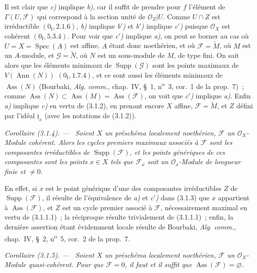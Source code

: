\documentclass[10pt,oneside]{book}
\makeatletter
\newenvironment{corollary}[1][]{%
  \par\medskip\noindent\itshape Corollaire (#1). ---\ }{\par}
\newcommand{\EGAReaderTarget}[2]{\hypertarget{#1}{}\@bsphack\begingroup\def\@currentHref{#1}\label{#2}\endgroup\@esphack}
\makeatother
\begin{document}
Il est clair que \emph{c)} implique \emph{b)}, car il suffit de prendre pour
$f$ l'élément de $\Gamma(U,\mathcal F)$ qui correspond à la section unité de
$\mathcal O_Z|U$. Comme $U\cap Z$ est irréductible $(0_{\mathrm I},2.1.6)$,
\emph{b)} implique \emph{b$'$)} et \emph{b$'$)} implique \emph{c$'$)} puisque
$\mathcal O_X$ est cohérent $(0_{\mathrm I},5.3.4)$. Pour voir que
\emph{c$'$)} implique \emph{a)}, on peut se borner au cas où
$U=X=\operatorname{Spec}(A)$ est affine, $A$ étant donc noethérien, et où
$\mathcal F=\widetilde M$, où $M$ est un $A$-module, et
$\mathcal G=\widetilde N$, où $N$ est un sous-module de $M$, de type fini.
On sait alors que les éléments minimaux de $\operatorname{Supp}(\mathcal G)$
sont les points maximaux de $V(\operatorname{Ann}(N))$ $(0_{\mathrm I},1.7.4)$,
et ce sont aussi les éléments minimaux de $\operatorname{Ass}(N)$ (Bourbaki,
\emph{Alg. comm.}, chap.~IV, \S~1, n\textsuperscript{o}~3, cor.~1 de la
prop.~7)~; comme $\operatorname{Ass}(N)\subset\operatorname{Ass}(M)
=\operatorname{Ass}(\mathcal F)$, on voit que \emph{c$'$)} implique
\emph{a)}. Enfin \emph{a)} implique \emph{c)} en vertu de (3.1.2), en
prenant encore $X$ affine, $\mathcal F=\widetilde M$, et $Z$ défini par
l'idéal $\mathfrak j_x$ (avec les notations de (3.1.2)).

\begin{corollary}[3.1.4]
\label{IV.2.3.1.4-fr}
Soient $X$ un préschéma localement noethérien, $\mathcal F$ un
$\mathcal O_X$-Module cohérent. Alors les cycles premiers maximaux associés à
$\mathcal F$ sont les composantes irréductibles de
$\operatorname{Supp}(\mathcal F)$, et les points génériques de ces composantes
sont les points $x\in X$ tels que $\mathcal F_x$ soit un
$\mathcal O_x$-Module de longueur finie et $\ne0$.
\end{corollary}

En effet, si $x$ est le point générique d'une des composantes irréductibles
$Z$ de $\operatorname{Supp}(\mathcal F)$, il résulte de l'équivalence de
\emph{a)} et \emph{c$'$)} dans (3.1.3) que $x$ appartient à
$\operatorname{Ass}(\mathcal F)$, et $Z$ est un cycle premier associé à
$\mathcal F$, nécessairement maximal en vertu de (3.1.1.1)~; la réciproque
résulte trivialement de (3.1.1.1)~; enfin, la dernière assertion étant
évidemment locale résulte de Bourbaki, \emph{Alg. comm.}, chap.~IV, \S~2,
n\textsuperscript{o}~5, cor.~2 de la prop.~7.

\begin{corollary}[3.1.5]
\EGAReaderTarget{ega4.c04.cor.3-1-5}{IV.2.3.1.5-fr}
Soient $X$ un préschéma localement noethérien, $\mathcal F$ un
$\mathcal O_X$-Module quasi-cohérent. Pour que $\mathcal F=0$, il faut et il
suffit que $\operatorname{Ass}(\mathcal F)=\varnothing$.
\end{corollary}
\end{document}
